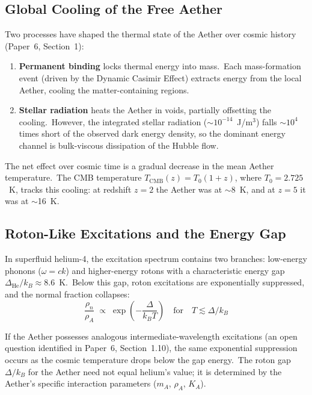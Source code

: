\documentclass[12pt,letterpaper]{article}
\newcommand{\rhoa}{\rho_{\!A}}
\newcommand{\Ka}{K_{\!A}}
\begin{document}
\subsection{Global Cooling of the Free Aether}

Two processes have shaped the thermal state of the Aether over cosmic history
(Paper~6, Section~1):

\begin{enumerate}[leftmargin=2em]
  \item \textbf{Permanent binding} locks thermal energy into mass.\ Each
    mass-formation event (driven by the Dynamic Casimir Effect) extracts energy
    from the local Aether, cooling the matter-containing regions.

  \item \textbf{Stellar radiation} heats the Aether in voids, partially
    offsetting the cooling.\ However, the integrated stellar radiation
    ($\sim$$10^{-14}$~J/m$^3$) falls $\sim$$10^4$ times short of the observed
    dark energy density, so the dominant energy channel is bulk-viscous
    dissipation of the Hubble flow.
\end{enumerate}

The net effect over cosmic time is a gradual decrease in the mean Aether
temperature.\ The CMB temperature $T_{\mathrm{CMB}}(z) = T_0(1 + z)$, where
$T_0 = 2.725$~K, tracks this cooling: at redshift $z = 2$ the Aether was at
$\sim$8~K, and at $z = 5$ it was at $\sim$16~K.


\subsection{Roton-Like Excitations and the Energy Gap}

In superfluid helium-4, the excitation spectrum contains two branches: low-energy
phonons ($\omega = ck$) and higher-energy rotons with a characteristic energy gap
$\Delta_{\mathrm{He}}/k_B \approx 8.6$~K.\ Below this gap, roton excitations are
exponentially suppressed, and the normal fraction collapses:
%
\begin{equation}
  \frac{\rho_n}{\rhoa} \;\propto\; \exp\!\left(-\frac{\Delta}{k_B T}\right)
  \quad\text{for}\quad T \lesssim \Delta/k_B
  \label{eq:normal-fraction}
\end{equation}

If the Aether possesses analogous intermediate-wavelength excitations (an open
question identified in Paper~6, Section~1.10), the same exponential suppression
occurs as the cosmic temperature drops below the gap energy.\ The roton gap
$\Delta/k_B$ for the Aether need not equal helium's value; it is determined by
the Aether's specific interaction parameters ($m_A$, $\rhoa$, $\Ka$).
\end{document}
